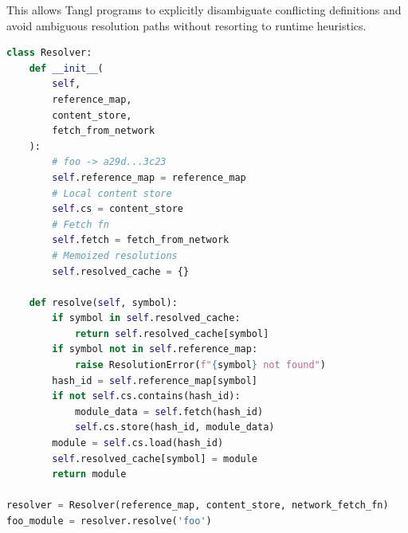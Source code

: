 \documentclass[sigplan,screen]{acmart}
\begin{document}
This allows Tangl programs to explicitly disambiguate conflicting definitions and avoid ambiguous resolution paths without resorting to runtime heuristics.

\begin{lstlisting}[language=Python,
    caption={Lazy symbol resolution in the \texttt{Resolver} class},
    label={fig:lazy-resolution},
    basicstyle=\scriptsize\ttfamily,
    keywordstyle=\ttfamily,
    emphstyle=\ttfamily,
    commentstyle=\ttfamily,
    stringstyle=\ttfamily,
    breaklines=true,
    breakindent=0pt,
    frame=single,
    columns=fullflexible,
    keepspaces=true,
]
class Resolver:
    def __init__(
        self,
        reference_map,
        content_store,
        fetch_from_network
    ):
        # foo -> a29d...3c23
        self.reference_map = reference_map
        # Local content store
        self.cs = content_store
        # Fetch fn
        self.fetch = fetch_from_network
        # Memoized resolutions
        self.resolved_cache = {}

    def resolve(self, symbol):
        if symbol in self.resolved_cache:
            return self.resolved_cache[symbol]
        if symbol not in self.reference_map:
            raise ResolutionError(f"{symbol} not found")
        hash_id = self.reference_map[symbol]
        if not self.cs.contains(hash_id):
            module_data = self.fetch(hash_id)
            self.cs.store(hash_id, module_data)
        module = self.cs.load(hash_id)
        self.resolved_cache[symbol] = module
        return module

resolver = Resolver(reference_map, content_store, network_fetch_fn)
foo_module = resolver.resolve('foo')
\end{lstlisting}
\end{document}
